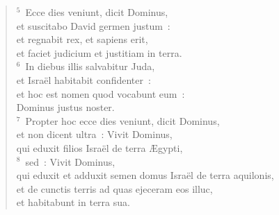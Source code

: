 \begin{flushleft}\begin{verse}${}^{5}$~Ecce dies veniunt, dicit Dominus,\\ et suscitabo David germen justum~:\\ et regnabit rex, et sapiens erit,\\ et faciet judicium et justitiam in terra.\\
${}^{6}$~In diebus illis salvabitur Juda,\\ et Isra\"el habitabit confidenter~:\\ et hoc est nomen quod vocabunt eum~:\\ Dominus justus noster.\\
${}^{7}$~Propter hoc ecce dies veniunt, dicit Dominus,\\ et non dicent ultra~: Vivit Dominus,\\ qui eduxit filios Isra\"el de terra \AE gypti,\\
${}^{8}$~sed~: Vivit Dominus,\\ qui eduxit et adduxit semen domus Isra\"el de terra aquilonis,\\ et de cunctis terris ad quas ejeceram eos illuc,\\ et habitabunt in terra sua.\end{verse}\end{flushleft}


